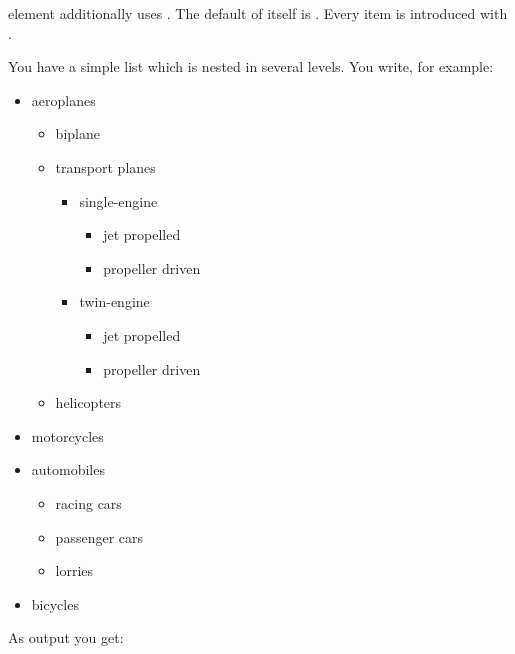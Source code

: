   element  additionally uses . The
  default of  itself is .%
  Every item is introduced with .%
    \begin{Example}
      You have a simple list which is nested in several levels. You write,
      for example:
\begin{lstcode}
  \begin{itemize}
    \item aeroplanes
    \begin{itemize}
      \item biplane
      \item transport planes
      \begin{itemize}
        \item single-engine
        \begin{itemize}
          \item jet propelled
          \item propeller driven
        \end{itemize}
        \item twin-engine
        \begin{itemize}
	      \item jet propelled
		  \item propeller driven
		\end{itemize}
      \end{itemize}
      \item helicopters
    \end{itemize}
    \item motorcycles
    \item automobiles
    \begin{itemize}
      \item racing cars
      \item passenger cars
      \item lorries
    \end{itemize}
    \item bicycles
  \end{itemize}
\end{lstcode}
      As output you get:
      \begin{ShowOutput}[\baselineskip]

\end{ShowOutput}
\end{Example}
